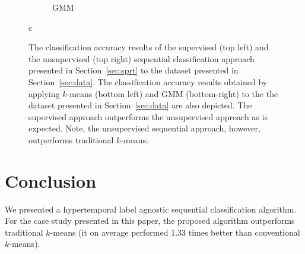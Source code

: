 \documentclass{article}
\begin{document}
\begin{figure}[h]
\begin{subfigure}[b]{0.49\linewidth}
    \caption{GMM} 
    \label{fig7:d} 
  \end{subfigure} 
  \caption{c}
  \label{fig7} 
  \caption{The classification accuracy results of the supervised (top left) and the unsupervised (top right) sequential classification approach presented in Section~\ref{sec:sprt} to the dataset presented in Section~\ref{sec:data}. The classification accuracy results obtained by applying $k$-means (bottom left) and GMM (bottom-right) to the the dataset presented in Section~\ref{sec:data} are also depicted. The supervised approach outperforms the 
  unsupervised approach as is expected. Note, the unsupervised sequential approach, however, outperforms traditional $k$-means.}
  \label{fig:results}
\end{figure}

\section{Conclusion}
\label{sec:ref}
We presented a hypertemporal label agnostic sequential classification algorithm. For the case study presented in this paper, the proposed algorithm 
outperforms traditional $k$-means (it on average performed 1.33 times better than conventional $k$-means). 




\end{document}
